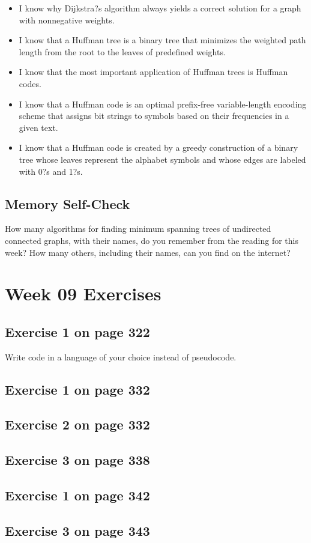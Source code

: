 \documentclass[12pt]{amsart}
\begin{document}
\begin{itemize}
 \item I know why Dijkstra?s algorithm always yields a correct solution for a graph with nonnegative weights.
 \item I know that a Huffman tree is a binary tree that minimizes the weighted path length from the root to the leaves of predefined weights.
 \item I know that the most important application of Huffman trees is Huffman codes.
 \item I know that a Huffman code is an optimal prefix-free variable-length encoding scheme that assigns bit strings to symbols based on their frequencies in a given text.
 \item I know that a Huffman code is created by a greedy construction of a binary tree whose leaves represent the alphabet symbols and whose edges are labeled with 0?s and 1?s.
\end{itemize}
\subsection{Memory Self-Check}
How many algorithms for finding minimum spanning trees of undirected connected graphs, with their names, do you remember from the reading for this week? How many others, including their names, can you find on the internet?
 \section{Week 09 Exercises}
\subsection{ Exercise 1 on page 322}
Write code in a language of your choice instead of pseudocode. 
\subsection{Exercise 1 on page 332} 
\subsection{Exercise 2 on page 332} 
\subsection{Exercise 3 on page 338} 
\subsection{Exercise 1 on page 342} 
\subsection{Exercise 3 on page 343}
\end{document}
